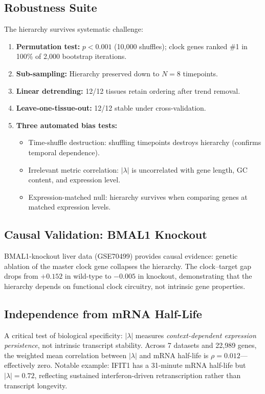 \documentclass[11pt,letterpaper]{article}
\begin{document}
\subsection{Robustness Suite}

The hierarchy survives systematic challenge:

\begin{enumerate}
\item \textbf{Permutation test:} $p < 0.001$ (10,000 shuffles); clock genes ranked \#1 in 100\% of 2,000 bootstrap iterations.
\item \textbf{Sub-sampling:} Hierarchy preserved down to $N = 8$ timepoints.
\item \textbf{Linear detrending:} 12/12 tissues retain ordering after trend removal.
\item \textbf{Leave-one-tissue-out:} 12/12 stable under cross-validation.
\item \textbf{Three automated bias tests:}
\begin{itemize}
\item Time-shuffle destruction: shuffling timepoints destroys hierarchy (confirms temporal dependence).
\item Irrelevant metric correlation: $|\lambda|$ is uncorrelated with gene length, GC content, and expression level.
\item Expression-matched null: hierarchy survives when comparing genes at matched expression levels.
\end{itemize}
\end{enumerate}

\subsection{Causal Validation: BMAL1 Knockout}

BMAL1-knockout liver data (GSE70499) provides causal evidence: genetic ablation of the master clock gene collapses the hierarchy. The clock--target gap drops from $+0.152$ in wild-type to $-0.005$ in knockout, demonstrating that the hierarchy depends on functional clock circuitry, not intrinsic gene properties.

\subsection{Independence from mRNA Half-Life}

A critical test of biological specificity: $|\lambda|$ measures \textit{context-dependent expression persistence}, not intrinsic transcript stability. Across 7 datasets and 22,989 genes, the weighted mean correlation between $|\lambda|$ and mRNA half-life is $\rho = 0.012$---effectively zero. Notable example: IFIT1 has a 31-minute mRNA half-life but $|\lambda| = 0.72$, reflecting sustained interferon-driven retranscription rather than transcript longevity.
\end{document}
